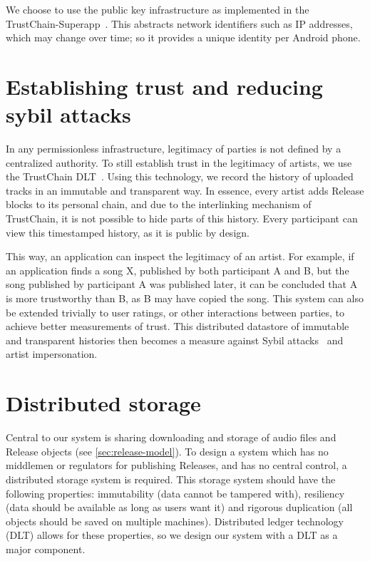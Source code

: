 We choose to use the public key infrastructure as implemented in the TrustChain-Superapp~\citep{mattskala2020}. This abstracts network identifiers such as IP addresses, which may change over time; so it provides a unique identity per Android phone.

\section{Establishing trust and reducing sybil attacks}
In any permissionless infrastructure, legitimacy of parties is not defined by a centralized authority. To still establish trust in the legitimacy of artists, we use the TrustChain DLT~\citep{otte2017trustchain}. Using this technology, we record the history of uploaded tracks in an immutable and transparent way. In essence, every artist adds Release blocks to its personal chain, and due to the interlinking mechanism of TrustChain, it is not possible to hide parts of this history. Every participant can view this timestamped history, as it is public by design. 

This way, an application can inspect the legitimacy of an artist. For example, if an application finds a song X, published by both participant A and B, but the song published by participant A was published later, it can be concluded that A is more trustworthy than B, as B may have copied the song. This system can also be extended trivially to user ratings, or other interactions between parties, to achieve better measurements of trust. This distributed datastore of immutable and transparent histories then becomes a measure against Sybil attacks~\citep{douceur2002sybil} and artist impersonation.

\section{Distributed storage}
\label{sec:distributed-storage}
Central to our system is sharing downloading and storage of audio files and Release objects (see \ref{sec:release-model}). To design a system which has no middlemen or regulators for publishing Releases, and has no central control, a distributed storage system is required. This storage system should have the following properties: immutability (data cannot be tampered with), resiliency (data should be available as long as users want it) and rigorous duplication (all objects should be saved on multiple machines). Distributed ledger technology (DLT) allows for these properties, so we design our system with a DLT as a major component.

